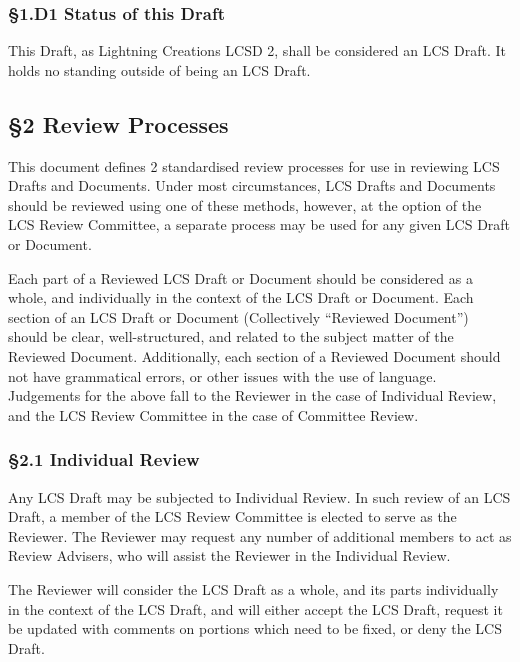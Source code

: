 \hypertarget{d1-status-of-this-draft}{%
\subsubsection{§1.D1 Status of this
Draft}\label{d1-status-of-this-draft}}

This Draft, as Lightning Creations LCSD 2, shall be considered an LCS
Draft. It holds no standing outside of being an LCS Draft.

\hypertarget{review-processes}{%
\subsection{§2 Review Processes}\label{review-processes}}

This document defines 2 standardised review processes for use in
reviewing LCS Drafts and Documents. Under most circumstances, LCS Drafts
and Documents should be reviewed using one of these methods, however, at
the option of the LCS Review Committee, a separate process may be used
for any given LCS Draft or Document.

Each part of a Reviewed LCS Draft or Document should be considered as a
whole, and individually in the context of the LCS Draft or Document.
Each section of an LCS Draft or Document (Collectively ``Reviewed
Document'') should be clear, well-structured, and related to the subject
matter of the Reviewed Document. Additionally, each section of a
Reviewed Document should not have grammatical errors, or other issues
with the use of language. Judgements for the above fall to the Reviewer
in the case of Individual Review, and the LCS Review Committee in the
case of Committee Review.

\hypertarget{individual-review}{%
\subsubsection{§2.1 Individual Review}\label{individual-review}}

Any LCS Draft may be subjected to Individual Review. In such review of
an LCS Draft, a member of the LCS Review Committee is elected to serve
as the Reviewer. The Reviewer may request any number of additional
members to act as Review Advisers, who will assist the Reviewer in the
Individual Review.

The Reviewer will consider the LCS Draft as a whole, and its parts
individually in the context of the LCS Draft, and will either accept the
LCS Draft, request it be updated with comments on portions which need to
be fixed, or deny the LCS Draft.

